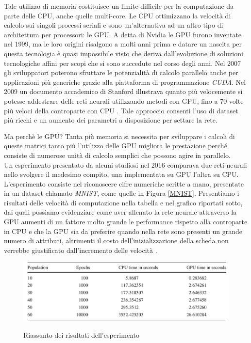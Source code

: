 Tale utilizzo di memoria costituisce un limite difficile per la computazione da parte delle CPU, anche quelle multi-core. Le CPU ottimizzano la velocità di calcolo sui singoli processi seriali e sono un'alternativa ad un altro tipo di architettura per processori: le GPU. A detta di Nvidia le GPU furono inventate nel 1999, ma le loro origini risalgono a molti anni prima e datare un nascita per questa tecnologia è quasi impossibile visto che deriva dall'evoluzione di soluzioni tecnologiche affini per scopi che si sono succedute nel corso degli anni. Nel 2007 gli sviluppatori poterono sfruttare le potenzialità di calcolo parallelo anche per applicazioni più generiche grazie alla piattaforma di programmazione \textit{CUDA}. Nel 2009 un documento accademico di Stanford illustrava quanto più velocemente si potesse addestrare delle reti neurali utilizzando metodi con GPU, fino a 70 volte più veloci della controparte con CPU \cite{raina2009large}. Tale approccio consentì l'uso di dataset più ricchi e un aumento dei parametri a disposizione per settare la rete. 

Ma perchè le GPU? Tanta più memoria si necessita per sviluppare i calcoli di queste matrici tanto più l'utilizzo delle GPU migliora le prestazione perché consiste di numerose unità di calcolo semplici che possono agire in parallelo.
\\
Un esperimento presentato da alcuni studiosi nel 2016 comparava due reti neurali nello svolgere il medesimo compito, una implementata su GPU l'altra su CPU. L'esperimento consiste nel riconoscere cifre numeriche scritte a mano, presentate in un dataset chiamato \textit{MNIST}, come quelle in Figura \ref{MNIST}. Presentiamo i risultati delle velocità di computazione nella tabella e nel grafico riportati sotto, dai quali possiamo evidenziare come aver allenato la rete neurale attraverso la GPU aumenti di un fattore molto grande le performance rispetto alla controparte in CPU e che la GPU sia da preferire quando nella rete sono presenti un grande numero di attributi, altrimenti il costo dell'inizializzazione della scheda non verrebbe giustificato dall'incremento delle velocità \cite{brito2016gpu}.

\vspace{15mm}

\begin{figure}[h]
\centering
{\includegraphics[scale=0.65]{media_tesi/table_experiment.png}}
\vspace{0.2cm}
\caption{Riassunto dei risultati dell'esperimento \cite{brito2016gpu}}
\label{fig:subfig}
\end{figure}

